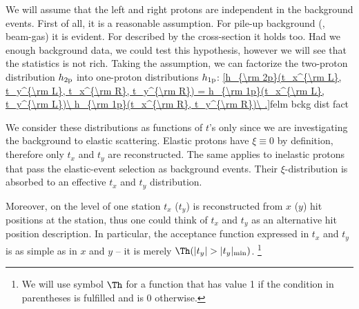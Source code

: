 

We will assume that the left and right protons are independent in the background events. First of all, it is a reasonable assumption. For pile-up background (, beam-gas) it is evident. For  described by the cross-section  it holds too. Had we enough background data, we could test this hypothesis, however we will see that the statistics is not rich. Taking the assumption, we can factorize the two-proton distribution $h_{\rm 2p}$ into one-proton distributions $h_{\rm 1p}$:
\eqref{h_{\rm 2p}(t_x^{\rm L}, t_y^{\rm L}, t_x^{\rm R}, t_y^{\rm R}) = h_{\rm 1p}(t_x^{\rm L}, t_y^{\rm L})\ h_{\rm 1p}(t_x^{\rm R}, t_y^{\rm R})\ .}{felm bckg dist fact}

We consider these distributions as functions of $t$'s only since we are investigating the background to elastic scattering. Elastic protons have $\xi\equiv 0$ by definition, therefore only $t_x$ and $t_y$ are reconstructed. The same applies to inelastic protons that pass the elastic-event selection as background events. Their $\xi$-distribution is absorbed to an effective $t_x$ and $t_y$ distribution.

Moreover, on the level of one station $t_x$ ($t_y$) is reconstructed from $x$ ($y$) hit positions at the station, thus one could think of $t_x$ and $t_y$ as an alternative hit position description. In particular, the acceptance function expressed in $t_x$ and $t_y$ is as simple as in $x$ and $y$ -- it is merely $\Th(|t_y| > |t_y|_{\rm min})$. \footnote{%
We will use symbol $\Th$ for a function that has value 1 if the condition in parentheses is fulfilled and is 0 otherwise.
}

\bmfig
{}
\emfig

